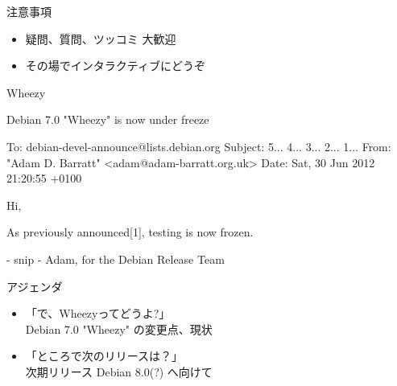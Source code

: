 \begin{frame}{注意事項}
\begin{itemize}
  \item 疑問、質問、ツッコミ 大歓迎
  \item その場でインタラクティブにどうぞ
\end{itemize}
\end{frame}


{


\begin{frame}[plain]%

\begin{center}
\pause
{\fontsize{40pt}{40pt}\selectfont\color{red}Wheezy}

\end{center}

\end{frame}
}

\begin{frame}[containsverbatim]{Debian 7.0 "Wheezy" is now under freeze}

\begin{commandline}

To: debian-devel-announce@lists.debian.org
Subject: 5... 4... 3... 2... 1...
From: "Adam D. Barratt" <adam@adam-barratt.org.uk>
Date: Sat, 30 Jun 2012 21:20:55 +0100

Hi, 

As previously announced[1], testing is now frozen.

- snip -
Adam,
for the Debian Release Team

\end{commandline}

\end{frame}

\begin{frame}{アジェンダ}
\begin{itemize}
 \item  「で、Wheezyってどうよ?」\\
   Debian 7.0 "Wheezy" の変更点、現状
 \item 「ところで次のリリースは？」\\
   次期リリース Debian 8.0(?) へ向けて
\end{itemize}
\end{frame}

